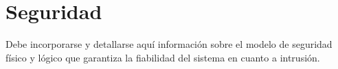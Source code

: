 \section{\forlnameref Seguridad}
\label{sec:securityImplementation}

\begin{shaded}
Debe incorporarse y detallarse aquí información sobre el modelo de seguridad físico y lógico que garantiza la fiabilidad del sistema en cuanto a intrusión.
\end{shaded}